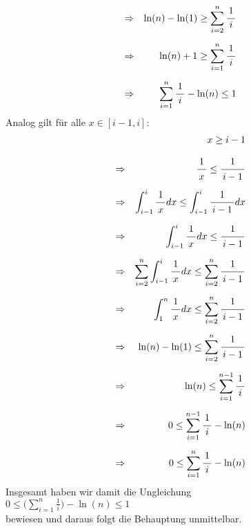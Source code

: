 \documentclass{article}
\newcommand{\bruch}[2]{\frac{\displaystyle \raisebox{1pt}[0pt][-0pt]{$\,#1\,$}}{\displaystyle \raisebox{0pt}[9pt]{$\,#2\,$}}}
\begin{document}
\begin{enumerate}
\begin{eqnarray*}
      & \Rightarrow & \ln(n) - \ln(1) \geq \sum\limits_{i=2}^{n} \bruch{1}{i} \\[0.2cm]
      & \Rightarrow & \ln(n) + 1 \geq \sum\limits_{i=1}^{n} \bruch{1}{i} \\[0.2cm]
      & \Rightarrow & \sum\limits_{i=1}^{n} \bruch{1}{i} - \ln(n) \leq 1 
      \end{eqnarray*}
      Analog gilt f\"ur alle $x \in [i-1,i]$:
      \begin{eqnarray*}
      &             & x \geq i - 1 \\[0.3cm]
      & \Rightarrow & \bruch{1}{x} \leq \bruch{1}{i-1} \\[0.2cm]
      & \Rightarrow & \int_{i-1}^i \bruch{1}{x} dx \leq \int_{i-1}^i \bruch{1}{i-1} dx \\[0.2cm]
      & \Rightarrow & \int_{i-1}^i \bruch{1}{x} dx \leq \bruch{1}{i-1} \\[0.2cm]
      & \Rightarrow & \sum\limits_{i=2}^{n} \int_{i-1}^i \bruch{1}{x} dx \leq 
                      \sum\limits_{i=2}^{n} \bruch{1}{i-1}                      \\[0.2cm]
      & \Rightarrow & \int_{1}^n \bruch{1}{x} dx \leq \sum\limits_{i=2}^{n} \bruch{1}{i-1} \\[0.2cm]
      & \Rightarrow & \ln(n) - \ln(1) \leq \sum\limits_{i=2}^{n} \bruch{1}{i-1} \\[0.2cm]
      & \Rightarrow & \ln(n) \leq \sum\limits_{i=1}^{n-1} \bruch{1}{i} \\[0.2cm]
      & \Rightarrow & 0 \leq \sum\limits_{i=1}^{n-1} \bruch{1}{i} - \ln(n) \\[0.2cm]
      & \Rightarrow & 0 \leq \sum\limits_{i=1}^{n} \bruch{1}{i} - \ln(n) 
      \end{eqnarray*}
      Insgesamt haben wir damit die Ungleichung
      \\[0.2cm]
      \hspace*{1.3cm}
      $0 \leq \biggl(\sum\limits_{i=1}^n \frac{1}{i}\biggr) - \ln(n) \leq 1$
      \\[0.2cm]
      bewiesen und daraus folgt die Behauptung unmittelbar.
\end{enumerate}

\vspace{0.3cm}
\end{document}
